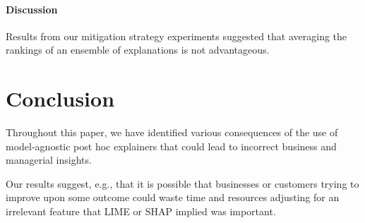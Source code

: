 \documentclass[11pt]{article}    %
\newcommand{\tw}[1]{\textcolor{red}{Tong: #1}}
\begin{document}
\paragraph{Discussion}
 Results from our mitigation strategy experiments suggested that averaging the rankings of an ensemble of explanations is not advantageous.


\section{Conclusion}
Throughout this paper, we have identified various consequences of the use of model-agnostic post hoc explainers that could lead to incorrect business and managerial insights. 

Our results suggest, e.g., that it is possible that businesses or customers trying to improve upon some outcome could waste time and resources adjusting for an irrelevant feature that LIME or SHAP implied was important.

        










\clearpage

\end{document}

